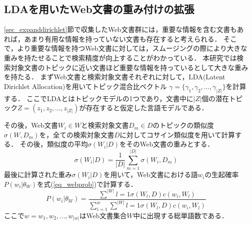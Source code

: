 \subsection{LDAを用いたWeb文書の重み付けの拡張}
\ref{sec_expanddirichlet}節で収集したWeb文書群には，重要な情報を含む文書もあれば，あまり有用な情報を持っていない文書も存在すると考えられる．
そこで，より重要な情報を持つWeb文書に対しては，スムージングの際により大きな重みを持たせることで検索精度が向上することがわかっている．
本研究では検索対象文書のトピックに近い文書ほど重要な情報を持っているとして大きな重みを持たる．
まずWeb文書と検索対象文書それぞれに対して，LDA(Latent Dirichlet Allocation)を用いてトピック混合比ベクトル
$\gamma = \{\gamma_1, \gamma_2, ..., \gamma_|Z| \}$を計算する．
ここでLDAとはトピックモデルの1つであり，文書中に$|Z|$個の潜在トピック$Z = (z_1, z_2, ..., z_|Z|)$が存在すると仮定した言語モデルである．

その後，Web文書$W_i \in W$と検索対象文書$D_m \in D$のトピックの類似度$\sigma(W, D_m)$を，全ての検索対象文書$D$に対してコサイン類似度を用いて計算する．
その後，類似度の平均$\sigma(W_i | D)$をそのWeb文書の重みとする．
\begin{equation}
    \sigma(W_i | D) = \frac{1}{|D|}\sum^{|D|}_{m=1}\sigma(W_i, D_m) \label{eq_webweight}
\end{equation}
最後に計算された重み$\sigma(W_i | D)$を用いて，Web文書における語$w_i$の生起確率$P(w_i|\theta_W)$を式(\ref{eq_webprob})で計算する．
\begin{equation}
    P(w_i|\theta_W) = \frac{ \sum^{|W|}{l=1}\sigma(W_l, D)c(w_i, W_l) }{ \sum^{w}_{i=1} \sum^{|W|}{l=1}\sigma(W_l, D)c(w_i, W_l)}   \label{eq_webprob}
\end{equation}
ここで$w = {w_1, w_2, ..., w_|w|}$はWeb文書集合$W$中に出現する総単語数である．

